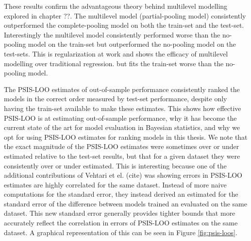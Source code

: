 These results confirm the advantageous theory behind multilevel modelling explored in chapter ??. The multilevel model (partial-pooling model) consistently outperformed the complete-pooling model on both the train-set and the test-set. Interestingly the multilevel model consistently performed worse than the no-pooling model on the train-set but outperformed the no-pooling model on the test-sets. This is regularization at work and shows the efficacy of multilevel modelling over traditional regression. but fits the train-set worse than the no-pooling model.

The PSIS-LOO estimates of out-of-sample performance consistently ranked the models in the correct order measured by test-set performance, despite only having the train-set available to make these estimates. This shows how effective PSIS-LOO is at estimating out-of-sample performance, why it has become the current state of the art for model evaluation in Bayesian statistics, and why we opt for using PSIS-LOO estimates for ranking models in this thesis. We note that the exact magnitude of the PSIS-LOO estimates were sometimes over or under estimated relative to the test-set results, but that for a given dataset they were consistently over or under estimated. This is interesting because one of the additional contributions of Vehtari et el. (cite) was showing errors in PSIS-LOO estimates are highly correlated for the same dataset. Instead of more naive computations for the standard error, they instead derived an estimated for the standard error of the difference between models trained an evaluated on the same dataset. This new standard error generally provides tighter bounds that more accurately reflect the correlation in errors of PSIS-LOO estimates on the same dataset. A graphical representation of this can be seen in Figure \ref{fig:psis-loos}.

